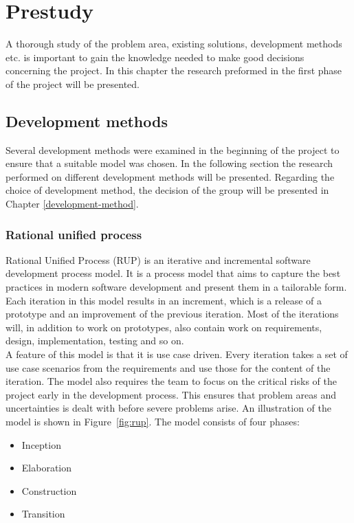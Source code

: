 \chapter{Prestudy}

\label{prestudy}

A thorough study of the problem area, existing solutions, development methods etc. is important to gain the knowledge needed to make good decisions concerning the project. In this chapter the research preformed in the first phase of the project will be presented.

\section{Development methods}
Several development methods were examined in the beginning of the project to ensure that a suitable model was chosen. In the following section the research performed on different development methods will be presented. Regarding the choice of development method, the decision of the group will be presented in Chapter \ref{development-method}.

\subsection{Rational unified process}
\label{sec:rup}
Rational Unified Process (RUP) is an iterative and incremental software development process model. It is a process model that aims to capture the best practices in modern software development and present them in a tailorable form.\cite{kruchten} Each iteration in this model results in an increment, which is a release of a prototype and an improvement of the previous iteration. Most of the iterations will, in addition to work on prototypes, also contain work on requirements, design, implementation, testing and so on.\\
\newline
A feature of this model is that it is use case driven. Every iteration takes a set of use case scenarios from the requirements and use those for the content of the iteration. The model also requires the team to focus on the critical risks of the project early in the development process. This ensures that problem areas and uncertainties is dealt with before severe problems arise. An illustration of the model is shown in Figure~\ref{fig:rup}.
\newline
The model consists of four phases:

\begin{itemize}
\item{Inception}
\item{Elaboration}
\item{Construction}
\item{Transition}
\end{itemize}

